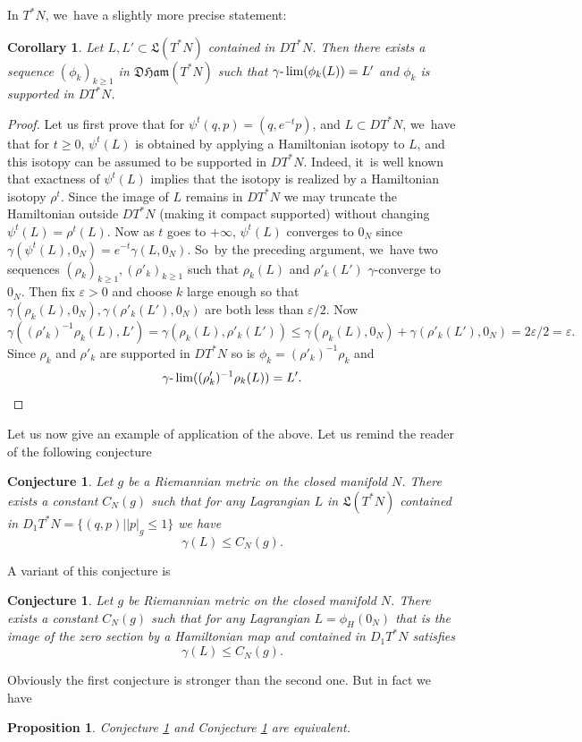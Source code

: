 \documentclass[JEP,XML,SOM,Unicode,NoFloatCountersInSection,published]{cedram}
\newtheorem{cor}[thm]{Corollary}
\newtheorem{prop}[thm]{Proposition}
\newtheorem{Conjecture}[thm]{Conjecture}
\theoremstyle{definition}
\newcommand{\DHam}{\mathfrak{DHam}}
\begin{document}
In $T^*N$, we~have a slightly more precise statement:
\begin{cor}\label{Weak-Nearby-with-support}
Let $L, L'\subset{\mathfrak L}(T^*N)$ contained in $DT^*N$. Then there exists a sequence $(\phi_k)_{k\geq 1}$ in $\DHam(T^*N)$ such that $\gamma\textup{-}\lim(\phi_k(L))=L'$ and $\phi_k$ is supported in $DT^*N$.
\end{cor}

\begin{proof}
Let us first prove that for $\psi^t(q,p)=(q,e^{-t}p)$, and $L\subset DT^*N$, we~have that for $t\geq 0$, $\psi^t(L)$ is obtained by applying a Hamiltonian isotopy to $L$, and this isotopy can be assumed to be supported in $DT^*N$. Indeed, it~is well known that exactness of $\psi^t(L)$ implies that the isotopy is realized by a Hamiltonian isotopy $\rho^t$. Since the image of $L$ remains in $DT^*N$ we may truncate the Hamiltonian outside $DT^*N$ (\ie making it compact supported) without changing $\psi^t(L)=\rho^t(L)$.
Now as $t$ goes to $+\infty$, $\psi^t(L)$ converges to $0_N$ since $\gamma(\psi^t(L),0_N)=e^{-t}\gamma(L,0_N)$. So~by the preceding argument, we~have two sequences $(\rho_k)_{k\geq 1}, (\rho'_k)_{k\geq 1}$ such that $\rho_k(L)$ and $\rho'_k(L')$ $\gamma$\nobreakdash-converge to $0_N$. Then fix $ \varepsilon >0$ and choose $k$ large enough so that $\gamma(\rho_k(L),0_N), \gamma(\rho'_k(L'),0_N)$ are both less than $ \varepsilon /2$. Now
\[
\gamma((\rho'_k)^{-1}\rho_k(L),L')=\gamma(\rho_k(L),\rho'_k(L'))\leq \gamma(\rho_k(L),0_N)+ \gamma(\rho'_k(L'),0_N)=2 \varepsilon /2= \varepsilon.
\]
Since $\rho_k$ and $\rho'_k$ are supported in $DT^*N$ so is $\phi_k=(\rho'_k)^{-1}\rho_k$ and
\[
\gamma\textup{-}\lim((\rho'_k)^{-1}\rho_k(L))=L'.\qedhere
\]
\end{proof}

Let us now give an example of application of the above. Let us remind the reader of the following conjecture
\begin{Conjecture}\label{Conj1} Let $g$ be a Riemannian metric on the closed manifold $N$. There exists a constant $C_N(g)$ such that for any Lagrangian $L$ in ${\mathfrak L}(T^*N)$ contained in $D_1T^*N=\{(q,p)\mid \vert p \vert_g\leq 1\}$ we have\vspace*{-3pt}
\[
\gamma(L)\leq C_N(g).
\]
\end{Conjecture}
A variant of this conjecture is
\begin{Conjecture}\label{Conj2} Let $g$ be Riemannian metric on the closed manifold $N$. There exists a constant $C_N(g)$ such that for any Lagrangian $L=\phi_H(0_N)$ that is the image of the zero section by a Hamiltonian map and contained in $D_1T^*N$ satisfies\vspace*{-3pt}\enlargethispage{\baselineskip}
\[
\gamma(L)\leq C_N(g).
\]
\end{Conjecture}
Obviously the first conjecture is stronger than the second one. But in fact we have
\begin{prop}
Conjecture \ref{Conj1} and Conjecture \ref{Conj2} are equivalent.
\end{prop}
\end{document}
